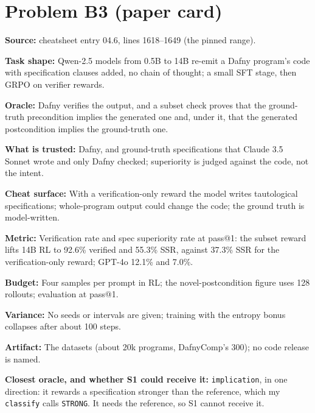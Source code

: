 \documentclass[11pt]{article}
\begin{document}
\section*{Problem B3 (paper card)}\label{ans:B3}
\begin{answer}
\textbf{Source:} cheatsheet entry 04.6, lines 1618--1649 (the pinned range).

\textbf{Task shape:} Qwen-2.5 models from 0.5B to 14B re-emit a Dafny
program's code with specification clauses added, no chain of thought; a small
SFT stage, then GRPO on verifier rewards.

\textbf{Oracle:} Dafny verifies the output, and a subset check proves that the
ground-truth precondition implies the generated one and, under it, that the
generated postcondition implies the ground-truth one.

\textbf{What is trusted:} Dafny, and ground-truth specifications that Claude 3.5
Sonnet wrote and only Dafny checked; superiority is judged against the code,
not the intent.

\textbf{Cheat surface:} With a verification-only reward the model writes
tautological specifications; whole-program output could change the code; the
ground truth is model-written.

\textbf{Metric:} Verification rate and spec superiority rate at pass@1: the
subset reward lifts 14B RL to 92.6\% verified and 55.3\% SSR, against 37.3\%
SSR for the verification-only reward; GPT-4o 12.1\% and 7.0\%.

\textbf{Budget:} Four samples per prompt in RL; the novel-postcondition figure
uses 128 rollouts; evaluation at pass@1.

\textbf{Variance:} No seeds or intervals are given; training with the entropy
bonus collapses after about 100 steps.

\textbf{Artifact:} The datasets (about 20k programs, DafnyComp's 300); no code
release is named.

\textbf{Closest oracle, and whether S1 could receive it:} \texttt{implication},
in one direction: it rewards a specification stronger than the reference, which
my \texttt{classify} calls \texttt{STRONG}. It needs the reference, so S1
cannot receive it.
\end{answer}

\end{document}
